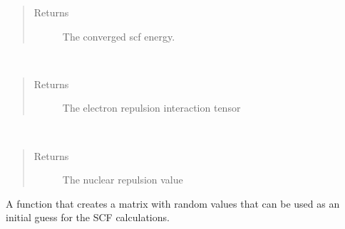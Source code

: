 \documentclass[letterpaper,10pt,english]{sphinxmanual}
\begin{document}
\begin{fulllineitems}
\begin{fulllineitems}
\begin{quote}
\begin{description}
\begin{itemize}
\end{itemize}

\item[{Returns}] \leavevmode
The converged scf energy.

\end{description}\end{quote}

\end{fulllineitems}


\begin{fulllineitems}
\label{\detokenize{GHF:hf.HartreeFock.GHF.MF.get_two_e}}~\begin{quote}\begin{description}
\item[{Returns}] \leavevmode
The electron repulsion interaction tensor

\end{description}\end{quote}

\end{fulllineitems}


\begin{fulllineitems}
\label{\detokenize{GHF:hf.HartreeFock.GHF.MF.nuc_rep}}~\begin{quote}\begin{description}
\item[{Returns}] \leavevmode
The nuclear repulsion value

\end{description}\end{quote}

\end{fulllineitems}


\begin{fulllineitems}
\label{\detokenize{GHF:hf.HartreeFock.GHF.MF.random_guess}}
A function that creates a matrix with random values that can be used as an initial guess
for the SCF calculations.


\end{fulllineitems}
\end{fulllineitems}
\end{document}
